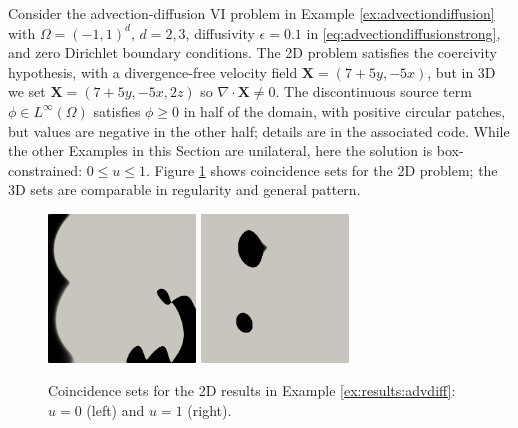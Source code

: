 \documentclass[review,hidelinks,onefignum,onetabnum,final]{siamart220329}  %
\newcommand{\eps}{\epsilon}
\newcommand{\grad}{\nabla}
\newcommand{\bX}{\mathbf{X}}
\begin{document}
\begin{example}  \label{ex:results:advdiff}
Consider the advection-diffusion VI problem in Example \ref{ex:advectiondiffusion} with $\Omega=(-1,1)^d$, $d=2,3$, diffusivity $\eps=0.1$ in \eqref{eq:advectiondiffusionstrong}, and zero Dirichlet boundary conditions.  The 2D problem satisfies the coercivity hypothesis, with a divergence-free velocity field $\bX = (7+5y,-5x)$, but in 3D we set $\bX = (7+5y,-5x,2z)$ so $\grad\cdot\bX \ne 0$.  The discontinuous source term $\phi \in L^\infty(\Omega)$ satisfies $\phi\ge 0$ in half of the domain, with positive circular patches, but values are negative in the other half; details are in the associated code.  While the other Examples in this Section are unilateral, here the solution is box-constrained: $0 \le u \le 1$.  Figure \ref{fig:results:advdiff} shows coincidence sets for the 2D problem; the 3D sets are comparable in regularity and general pattern.

\begin{figure}[ht]
\centering
\includegraphics[width=0.35\textwidth]{poll2d-zero-set.png} \qquad \includegraphics[width=0.35\textwidth]{poll2d-one-set.png}
\caption{Coincidence sets for the 2D results in Example \ref{ex:results:advdiff}: $u=0$ (left) and $u=1$ (right).}
\label{fig:results:advdiff}
\end{figure}


\end{example}
\end{document}
